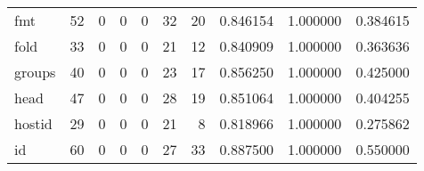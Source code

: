 \begin{longtable}{lrrrrrrrrr}
fmt       &                                        52 &                                                  0 &                                                  0 &                                                  0 &                                                 32 &                                                 20 &                                           0.846154 &                               1.000000 &                             0.384615 \\
fold      &                                        33 &                                                  0 &                                                  0 &                                                  0 &                                                 21 &                                                 12 &                                           0.840909 &                               1.000000 &                             0.363636 \\
groups    &                                        40 &                                                  0 &                                                  0 &                                                  0 &                                                 23 &                                                 17 &                                           0.856250 &                               1.000000 &                             0.425000 \\
head      &                                        47 &                                                  0 &                                                  0 &                                                  0 &                                                 28 &                                                 19 &                                           0.851064 &                               1.000000 &                             0.404255 \\
hostid    &                                        29 &                                                  0 &                                                  0 &                                                  0 &                                                 21 &                                                  8 &                                           0.818966 &                               1.000000 &                             0.275862 \\
id        &                                        60 &                                                  0 &                                                  0 &                                                  0 &                                                 27 &                                                 33 &                                           0.887500 &                               1.000000 &                             0.550000 \\

\end{longtable}
